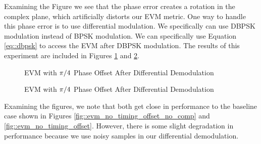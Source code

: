 \documentclass{article}
\begin{document}
\noindent Examining the Figure we see that the phase error creates a rotation in the complex plane, which artificially distorts our EVM metric. One way to handle this phase error is to use differential modulation. We specifically can use DBPSK modulation instead of BPSK modulation. We can specifically use Equation \ref{eq::dbpsk} to access the EVM after DBPSK modulation. The results of this experiment are included in Figures \ref{fig::evm_dpsk_modulation_no_comp} and \ref{fig::evm_dpsk_modulation}.

\begin{figure}[H]
	\centerline{}
	\caption{EVM with $\protect\pi/4$ Phase Offset After Differential Demodulation}
	\label{fig::evm_dpsk_modulation_no_comp}
\end{figure}

\begin{figure}[H]
	\centerline{}
	\caption{EVM with $\protect\pi/4$ Phase Offset After Differential Demodulation}
	\label{fig::evm_dpsk_modulation}
\end{figure}

\noindent Examining the figures, we note that both get close in performance to the baseline case shown in Figures \ref{fig::evm_no_timing_offset_no_comp} and \ref{fig::evm_no_timing_offset}. However, there is some slight degradation in performance because we use noisy samples in our differential demodulation. 
\end{document}
